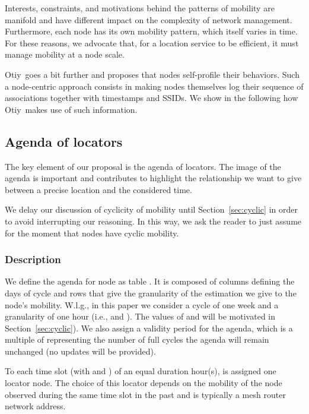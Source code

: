 \documentclass[a4paper]{sig-alternate-10pt}
\newcommand{\otiy}{{\sffamily Otiy}}
\begin{document}
Interests, constraints, and motivations behind the pat\-terns of
mobility are manifold and have different impact on the complexity of
network management. Further\-more, each node has its own mobility
pattern, which itself varies in time. For these reasons, we advo\-cate
that, for a location service to be efficient, it must manage
mobility at a node scale.

\otiy\ goes a bit further and proposes that nodes self-profile their
behaviors. Such a node-centric approach consists in making nodes
themselves log their sequence of associations together with
timestamps and SSIDs. We show in the following how \otiy\ makes use
of such information.


\subsection{Agenda of locators}
\label{subsec:agenda}

The key element of our proposal is the agenda of locators. The image
of the agenda is important and contributes to highlight the
relationship we want to give between a precise location and the
considered time.

We delay our discussion of cyclicity of mobility until
Section~\ref{sec:cyclic} in order to avoid interrupting our
reasoning. In this way, we ask the reader to just assume for the
moment that nodes have cyclic mobility.


\subsubsection{Description}
\label{subsubsec:description}

We define the agenda for node  as table . It is composed
of  columns defining the days of cycle and  rows that give the
granularity of the estimation we give to the node's mobility.
W.l.g., in this paper we consider a cycle of one week and a
granularity of one hour (i.e.,  and ). The values of 
and  will be motivated in Section~\ref{sec:cyclic}). We also
assign a validity period for the agenda, which is a multiple of 
representing the number of full cycles the agenda will remain
unchanged (no updates will be provided).

To each time slot  (with  and ) of an
equal duration  hour(s), is assigned one
locator node. The choice of this locator depends on the mobility of
the node observed during the same time slot in the past and is
typically a mesh router network address.
\end{document}
